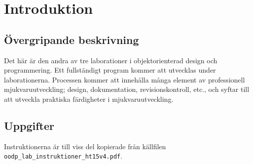 %
%

\section*{Introduktion}\label{sec:intro}

\subsection*{Övergripande beskrivning}\label{sec:beskrivning}
Det här är den andra av tre laborationer i objektorienterad design och
programmering. Ett fullständigt program kommer att utvecklas under
laborationerna. Processen kommer att innehålla många element av professionell
mjukvaruutveckling; design, dokumentation, revisionskontroll, etc., och syftar
till att utveckla praktiska färdigheter i mjukvaruutveckling.

\subsection*{Uppgifter}
Instruktionerna är till viss del kopierade från källfilen
\texttt{oodp\_lab\_instruktioner\_ht15v4.pdf}.

